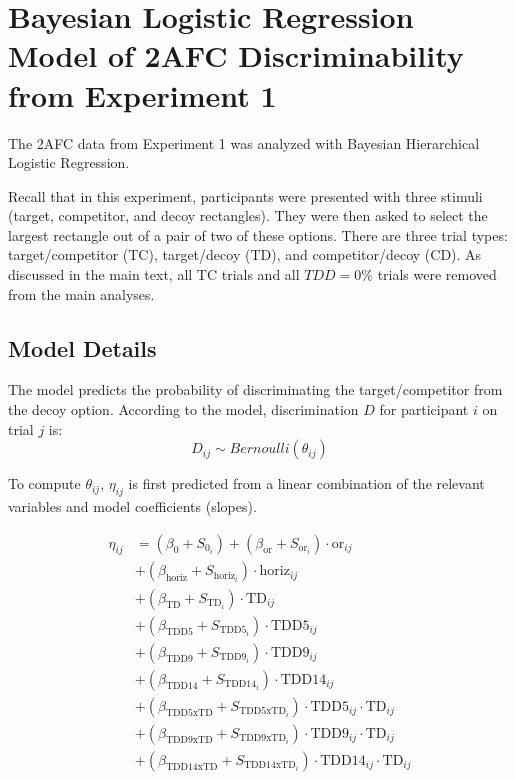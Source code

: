 \chapter{Bayesian Logistic Regression Model of 2AFC Discriminability from Experiment 1}
The 2AFC data from Experiment 1 was analyzed with Bayesian Hierarchical Logistic Regression. 

Recall that in this experiment, participants were presented with three stimuli (target, competitor, and decoy rectangles). They were then asked to select the largest rectangle out of a pair of two of these options. There are three trial types: target/competitor (TC), target/decoy (TD), and competitor/decoy (CD). As discussed in the main text, all TC trials and all $TDD = 0\%$ trials were removed from the main analyses.

\section{Model Details} 

The model predicts the probability of discriminating the target/competitor from the decoy option. According to the model, discrimination $D$ for participant $i$ on trial $j$ is:
\begin{equation}
    D_{ij} \sim Bernoulli(\theta_{ij})
\end{equation}

To compute $\theta_{ij}$, $\eta_{ij}$ is first predicted from a linear combination of the relevant variables and model coefficients (slopes).

\begin{equation}
\begin{aligned}
    \eta_{ij} &= (\beta_{0} + S_{0_{i}}) + (\beta_{\mathrm{or}} + S_{\mathrm{or}_{i}}) \cdot \mathrm{or}_{ij} \\
    &+ (\beta_{\mathrm{horiz}} + S_{\mathrm{horiz}_{i}}) \cdot \mathrm{horiz}_{ij} \\
    &+ (\beta_{\mathrm{TD}} + S_{\mathrm{TD}_{i}}) \cdot \mathrm{TD}_{ij} \\
    &+ (\beta_{\mathrm{TDD5}} + S_{\mathrm{TDD5}_{i}}) \cdot \mathrm{TDD5}_{ij} \\
    &+ (\beta_{\mathrm{TDD9}} + S_{\mathrm{TDD9}_{i}}) \cdot \mathrm{TDD9}_{ij} \\
    &+ (\beta_{\mathrm{TDD14}} + S_{\mathrm{TDD14}_{i}}) \cdot \mathrm{TDD14}_{ij} \\
    &+ (\beta_{\mathrm{TDD5xTD}} + S_{\mathrm{TDD5xTD}_{i}}) \cdot \mathrm{TDD5}_{ij} \cdot \mathrm{TD}_{ij} \\
    &+ (\beta_{\mathrm{TDD9xTD}} + S_{\mathrm{TDD9xTD}_{i}}) \cdot \mathrm{TDD9}_{ij} \cdot \mathrm{TD}_{ij} \\
    &+ (\beta_{\mathrm{TDD14xTD}} + S_{\mathrm{TDD14xTD}_{i}}) \cdot \mathrm{TDD14}_{ij} \cdot \mathrm{TD}_{ij}
\end{aligned}
\label{eqn:logit1}
\end{equation}

